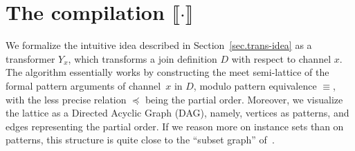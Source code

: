 \documentclass{LMCS}
\renewcommand{\_}{\mathord{\rule[-.25ex]{1ex}{.15ex}}}
\newcommand{\C}[1]{\llbracket#1\rrbracket}
\begin{document}
 \section{The compilation \texorpdfstring{$\C{\cdot}$}{scheme}}
\label{sec.trans}

We formalize the intuitive idea described in Section~\ref{sec.trans-idea} as a
transformer $Y_x$, which transforms a join definition $D$ with respect to
channel $x$. The algorithm essentially works by constructing the meet
semi-lattice of the formal pattern arguments of channel~$x$ in $D$, modulo
pattern equivalence $\equiv$, with the less precise relation $\preceq$ being
the partial order.  Moreover, we visualize the lattice as a Directed Acyclic
Graph (DAG), namely, vertices as patterns, and edges representing the partial
order.  If we reason more on instance sets than on patterns, this structure is
quite close to the ``subset graph'' of~\cite{pritchard99computing}.
 
\end{document}
